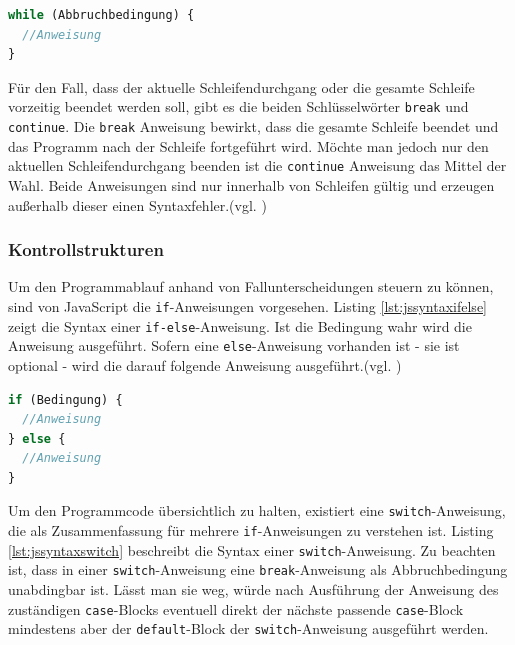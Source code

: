 \vspace{1em}
\begin{lstlisting}[language=JavaScript, caption=Syntax \texttt{while}-Schleife, label=lst:jssyntaxwhile]
while (Abbruchbedingung) {
  //Anweisung
}
\end{lstlisting}
	
Für den Fall, dass der aktuelle Schleifendurchgang oder die gesamte Schleife vorzeitig beendet werden soll, gibt es die beiden Schlüsselwörter \texttt{break} und \texttt{continue}. Die \texttt{break} Anweisung bewirkt, dass die gesamte Schleife beendet und das Programm nach der Schleife fortgeführt wird. Möchte man jedoch nur den aktuellen Schleifendurchgang beenden ist die \texttt{continue} Anweisung das Mittel der Wahl. Beide Anweisungen sind nur innerhalb von Schleifen gültig und erzeugen außerhalb dieser einen Syntaxfehler.(vgl. \cite[S.103f]{FlanJava2007})

\subsubsection{Kontrollstrukturen} Um den Programmablauf anhand von Fallunterscheidungen steuern zu können, sind von JavaScript die \texttt{if}-Anweisungen vorgesehen. Listing \ref{lst:jssyntaxifelse} zeigt die Syntax einer \texttt{if-else}-Anweisung. Ist die Bedingung wahr wird die Anweisung ausgeführt. Sofern eine \texttt{else}-Anweisung vorhanden ist - sie ist optional - wird die darauf folgende Anweisung ausgeführt.(vgl. \cite[S.80]{WenzJava2008})

\vspace{1em}
\begin{lstlisting}[language=JavaScript, caption=Syntax \texttt{if-else}-Anweisung, label=lst:jssyntaxifelse]
if (Bedingung) {
  //Anweisung
} else {
  //Anweisung
}
\end{lstlisting}
	
Um den Programmcode übersichtlich zu halten, existiert eine \texttt{switch}-Anweisung, die als Zusammenfassung für mehrere \texttt{if}-Anweisungen zu verstehen ist. Listing \ref{lst:jssyntaxswitch} beschreibt die Syntax einer \texttt{switch}-Anweisung. Zu beachten ist, dass in einer \texttt{switch}-Anweisung eine \texttt{break}-Anweisung als Abbruchbedingung unabdingbar ist. Lässt man sie weg, würde nach Ausführung der Anweisung des zuständigen \texttt{case}-Blocks eventuell direkt der nächste passende \texttt{case}-Block mindestens aber der \texttt{default}-Block der \texttt{switch}-Anweisung ausgeführt werden.

